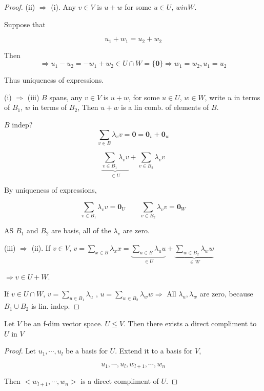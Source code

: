 \documentclass[a4paper]{article}
\begin{document}
\begin{proof}
	(ii) $ \Rightarrow $ (i). Any $ v \in V $ is $ u + w $ for some $ u \in U $, $ w in W $.
	
	Suppose that 
	

	\[ u_{1} + w_{1} = u_{2} + w_{2} \]
	
	
	Then 
	\[ \Rightarrow u_{1} - u_{2} = -w_{1} + w_{2} \in U \cap W = \{ \mathbf{0} \} \Rightarrow w_{1} = w_{2}, u_{1} = u_{2} \]
	
	Thus uniqueness of expressions.
	
	
	(i) $ \Rightarrow $ (iii) $ B $ spans, any $ v \in V $ is $ u + w $, for some $ u \in U $, $ w \in W $, write $ u $ in terms of $ B_{1} $, $ w $ in terms of $ B_{2} $, Then $ u + w $ is a lin comb. of elements of $ B $.
	
	$ B $ indep? \[ \sum_{v \in B} \lambda_{v} v = \mathbf{0} = \mathbf{0}_{v} + \mathbf{0}_{w} \]
	
	\[ \underbrace{\sum_{v \in B_{1}} \lambda_{v} v}_{\in U} + \sum_{v \in B_{2}} \lambda_{v} v \]
	
	
	By uniqueness of expressions, 
	
	\[ \sum_{v \in B_{1}} \lambda_{v} v = \mathbf{0}_{U} \qquad \sum_{v \in B_{2}} \lambda_{v} v = \mathbf{0}_{W} \]
	
	AS $ B_{1} $ and $ B_{2} $ are basis, all of the $ \lambda_{v} $ are zero. 
	
	
	(iii) $ \Rightarrow $ (ii). If $ v \in V $, $ v = \sum_{x \in B}  \lambda_{x} x = \underbrace{\sum_{u \in B} \lambda_{u} u }_{\in U} + \underbrace{\sum_{w \in B_{2}}   \lambda_{w} w }_{\in W}  $
	
	$ \Rightarrow v \in U + W $.
	
	
	If $ v \in U \cap W $, $ v = \sum_{u \in B_{1}}  \lambda_{u} $ , $u = \sum_{w \in B_{2}}  \lambda_{w} w  \Rightarrow $ All $ \lambda_{u},\lambda_{w} $ are zero, because $ B_{1} \cup B_{2}  $ is lin. indep.
	
\end{proof}
	
	\begin{lemma} 
		Let $ V $ be an f-dim vector space. $ U \leq V $.
		Then there exists a direct compliment to $ U $ in $ V $
		
	\end{lemma}

\begin{proof}
	Let $ u_{1},\cdots,u_{l} $ be a basis for $ U $. Extend it to a basis for $ V $, 
	
	\[ u_{1},\cdots,u_{l},w_{l+1},\cdots,w_{n} \]
	
	Then $ <w_{l+1},\cdots,w_{n}>$ is a direct compliment of $ U $. 
\end{proof}
\end{document}
